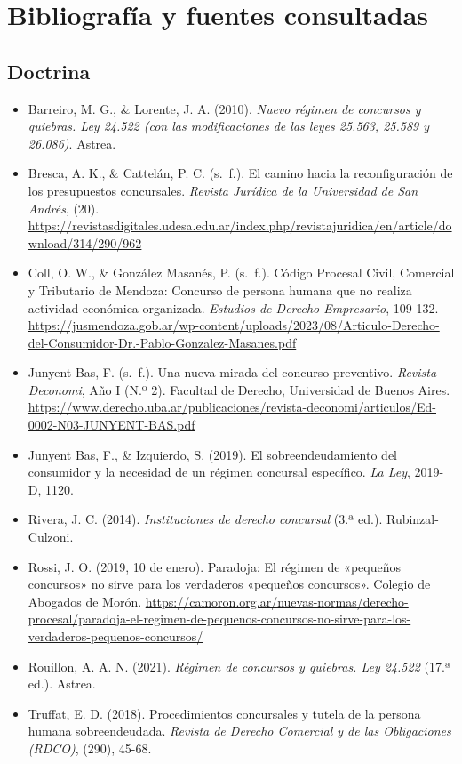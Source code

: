 \documentclass[12pt,oneside]{book}
\begin{document}
\chapter*{Bibliografía y fuentes consultadas}

{\small\raggedright
\section*{Doctrina}

\begin{itemize}[leftmargin=1.2em]
    \item Barreiro, M. G., \& Lorente, J. A. (2010). \textit{Nuevo régimen de concursos y quiebras. Ley 24.522 (con las modificaciones de las leyes 25.563, 25.589 y 26.086)}. Astrea.
    \item Bresca, A. K., \& Cattelán, P. C. (s.~f.). El camino hacia la reconfiguración de los presupuestos concursales. \textit{Revista Jurídica de la Universidad de San Andrés}, (20). \url{https://revistasdigitales.udesa.edu.ar/index.php/revistajuridica/en/article/download/314/290/962}
    \item Coll, O. W., \& González Masanés, P. (s.~f.). Código Procesal Civil, Comercial y Tributario de Mendoza: Concurso de persona humana que no realiza actividad económica organizada. \textit{Estudios de Derecho Empresario}, 109-132. \url{https://jusmendoza.gob.ar/wp-content/uploads/2023/08/Articulo-Derecho-del-Consumidor-Dr.-Pablo-Gonzalez-Masanes.pdf}
    \item Junyent Bas, F. (s.~f.). Una nueva mirada del concurso preventivo. \textit{Revista Deconomi}, Año I (N.º 2). Facultad de Derecho, Universidad de Buenos Aires. \url{https://www.derecho.uba.ar/publicaciones/revista-deconomi/articulos/Ed-0002-N03-JUNYENT-BAS.pdf}
    \item Junyent Bas, F., \& Izquierdo, S. (2019). El sobreendeudamiento del consumidor y la necesidad de un régimen concursal específico. \textit{La Ley}, 2019-D, 1120.
    \item Rivera, J. C. (2014). \textit{Instituciones de derecho concursal} (3.ª ed.). Rubinzal-Culzoni.
    \item Rossi, J. O. (2019, 10 de enero). Paradoja: El régimen de «pequeños concursos» no sirve para los verdaderos «pequeños concursos». Colegio de Abogados de Morón. \url{https://camoron.org.ar/nuevas-normas/derecho-procesal/paradoja-el-regimen-de-pequenos-concursos-no-sirve-para-los-verdaderos-pequenos-concursos/}
    \item Rouillon, A. A. N. (2021). \textit{Régimen de concursos y quiebras. Ley 24.522} (17.ª ed.). Astrea.
    \item Truffat, E. D. (2018). Procedimientos concursales y tutela de la persona humana sobreendeudada. \textit{Revista de Derecho Comercial y de las Obligaciones (RDCO)}, (290), 45-68.
\end{itemize}

}
\end{document}
